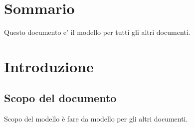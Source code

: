 \tableofcontents

\chapter*{Sommario}
Questo documento e' il modello per tutti gli altri documenti.


\thispagestyle{fancy} %

\chapter{Introduzione}
\thispagestyle{fancy} %

\section{Scopo del documento}
Scopo del modello \`e fare da modello per gli altri documenti.






